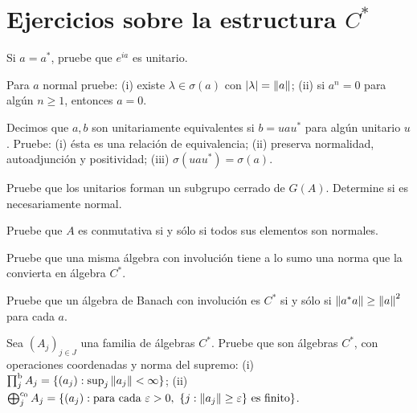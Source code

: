 \section{Ejercicios sobre la estructura \texorpdfstring{$C^*$}{C*}}

\begin{ejercicio}\label{ej:v3-l25-1}
Si $a=a^*$, pruebe que $e^{ia}$ es unitario.
\end{ejercicio}


\begin{ejercicio}\label{ej:v3-l25-2}
Para $a$ normal pruebe: (i) existe $\lambda\in\sigma(a)$ con $|\lambda|=\left\lVert a\right\rVert$; (ii) si $a^n=0$ para algún $n\ge1$, entonces $a=0$.
\end{ejercicio}


\begin{ejercicio}\label{ej:v3-l25-3}
Decimos que $a,b$ son unitariamente equivalentes si $b=uau^*$ para algún unitario $u$. Pruebe: (i) ésta es una relación de equivalencia; (ii) preserva normalidad, autoadjunción y positividad; (iii) $\sigma(uau^*)=\sigma(a)$.
\end{ejercicio}


\begin{ejercicio}\label{ej:v3-l25-4}
Pruebe que los unitarios forman un subgrupo cerrado de $G(A)$. Determine si es necesariamente normal.
\end{ejercicio}


\begin{ejercicio}\label{ej:v3-l25-5}
Pruebe que $A$ es conmutativa si y sólo si todos sus elementos son normales.
\end{ejercicio}


\begin{ejercicio}\label{ej:v3-l25-6}
Pruebe que una misma álgebra con involución tiene a lo sumo una norma que la convierta en álgebra $C^*$.
\end{ejercicio}


\begin{ejercicio}\label{ej:v3-l25-7}
Pruebe que un álgebra de Banach con involución es $C^*$ si y sólo si $\left\lVert a^*a\right\rVert\ge\left\lVert a\right\rVert^2$ para cada $a$.
\end{ejercicio}


\begin{ejercicio}\label{ej:v3-l25-8}
Sea $(A_j)_{j\in J}$ una familia de álgebras $C^*$. Pruebe que son álgebras $C^*$, con operaciones coordenadas y norma del supremo: (i) $\prod_j^{\mathrm b}A_j=\{(a_j):\sup_j\left\lVert a_j\right\rVert<\infty\}$; (ii) $\bigoplus_j^{c_0}A_j=\{(a_j):\text{para cada }\varepsilon>0,\ \{j:\left\lVert a_j\right\rVert\ge\varepsilon\}\text{ es finito}\}$.
\end{ejercicio}


